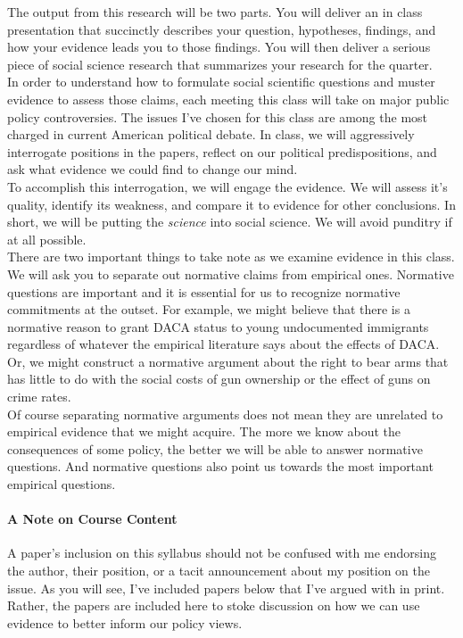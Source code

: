 \documentclass[12pt,letterpaper]{article}
\numberwithin{equation}{section}
\begin{document}
\noindent The output from this research will be two parts.  You will deliver an in class presentation that succinctly describes your question, hypotheses, findings, and how your evidence leads you to those findings.  You will then deliver a serious piece of social science research that summarizes your research for the quarter.    \\

\noindent In order to understand how to formulate social scientific questions and muster evidence to assess those claims, each meeting this class will take on major public policy controversies. The issues I've chosen for this class are among the most charged in current American political debate.  In class, we will aggressively interrogate positions in the papers, reflect on our political predispositions, and ask what evidence we could find to change our mind.  \\  

\noindent To accomplish this interrogation, we will engage the evidence.  We will assess it's quality, identify its weakness, and compare it to evidence for other conclusions.  In short, we will be putting the \emph{science} into social science.  We will avoid punditry if at all possible.    \\ 

\noindent There are two important things to take note as we examine evidence in this class.  We will ask you to separate out normative claims from empirical ones.  Normative questions are important and it is essential for us to recognize normative commitments at the outset. For example, we might believe that there is a normative reason to grant DACA status to young undocumented immigrants regardless of whatever the empirical literature says about the effects of DACA.  Or, we might construct a normative argument about the right to bear arms that has little to do with the social costs of gun ownership or the effect of guns on crime rates.  \\

\noindent Of course separating normative arguments does not mean they are unrelated to empirical evidence that we might acquire.  The more we know about the consequences of some policy, the better we will be able to answer normative questions.  And normative questions also point us towards the most important empirical questions. \\

\paragraph{A Note on Course Content} A paper's inclusion on this syllabus should not be confused with me endorsing the author, their position, or a tacit announcement about my position on the issue.  As you will see, I've included papers below that I've argued with in print.  Rather, the papers are included here to stoke discussion on how we can use evidence to better inform our policy views. \\ 
\end{document}
